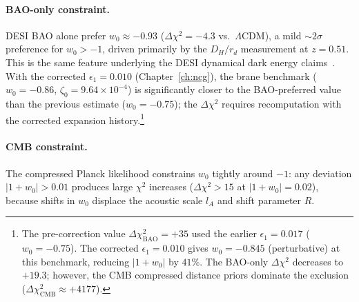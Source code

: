\paragraph{BAO-only constraint.} DESI BAO alone prefer $w_0 \approx -0.93$ ($\Delta\chi^2 = -4.3$ vs.\ $\Lambda$CDM), a mild ${\sim}2\sigma$ preference for $w_0 > -1$, driven primarily by the $D_H/r_d$ measurement at $z = 0.51$. This is the same feature underlying the DESI dynamical dark energy claims~\cite{ch2:DESIDR2}. With the corrected $\epsilon_1 = 0.010$ (Chapter~\ref{ch:ncg}), the brane benchmark ($w_0 = -0.86$, $\zeta_0 = 9.64 \times 10^{-4}$) is significantly closer to the BAO-preferred value than the previous estimate ($w_0 = -0.75$); the $\Delta\chi^2$ requires recomputation with the corrected expansion history.\footnote{The pre-correction value $\Delta\chi^2_\mathrm{BAO} = +35$ used the earlier $\epsilon_1 = 0.017$ ($w_0 = -0.75$). The corrected $\epsilon_1 = 0.010$ gives $w_0 = -0.845$ (perturbative) at this benchmark, reducing $|1+w_0|$ by $41\%$. The BAO-only $\Delta\chi^2$ decreases to $+19.3$; however, the CMB compressed distance priors dominate the exclusion ($\Delta\chi^2_\mathrm{CMB} \approx +4177$).}

\paragraph{CMB constraint.} The compressed Planck likelihood constrains $w_0$ tightly around $-1$: any deviation $|1+w_0| > 0.01$ produces large $\chi^2$ increases ($\Delta\chi^2 > 15$ at $|1+w_0| = 0.02$), because shifts in $w_0$ displace the acoustic scale $l_A$ and shift parameter $R$.

